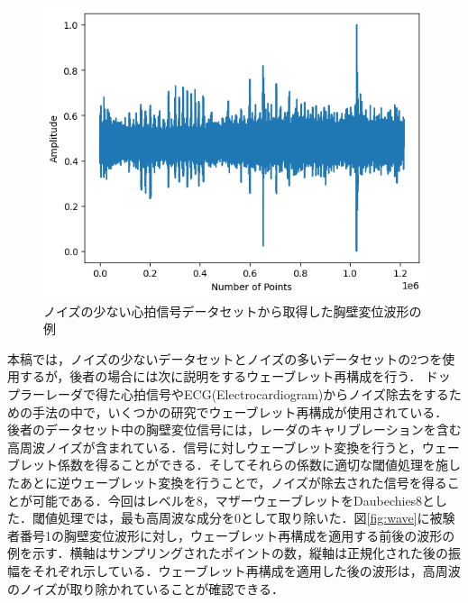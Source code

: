 \begin{figure}[H]
\begin{center}
\includegraphics[width=\linewidth]{./fig/distance01.png}
\end{center}
\caption{ノイズの少ない心拍信号データセットから取得した胸壁変位波形の例}
\label{fig:distance1}
\end{figure}

本稿では，ノイズの少ないデータセットとノイズの多いデータセットの2つを使用するが，後者の場合には次に説明をするウェーブレット再構成を行う．
ドップラーレーダで得た心拍信号やECG(Electrocardiogram)からノイズ除去をするための手法の中で，いくつかの研究でウェーブレット再構成が使用されている\cite{paper:de-noise_technique, paper:dengue, paper:ecg_noise_removal}．
後者のデータセット中の胸壁変位信号には，レーダのキャリブレーションを含む高周波ノイズが含まれている．信号に対しウェーブレット変換を行うと，ウェーブレット係数を得ることができる．そしてそれらの係数に適切な閾値処理を施したあとに逆ウェーブレット変換を行うことで，ノイズが除去された信号を得ることが可能である．今回はレベルを8，マザーウェーブレットをDaubechies8とした．閾値処理では，最も高周波な成分を0として取り除いた．図\ref{fig:wave}に被験者番号1の胸壁変位波形に対し，ウェーブレット再構成を適用する前後の波形の例を示す．横軸はサンプリングされたポイントの数，縦軸は正規化された後の振幅をそれぞれ示している．ウェーブレット再構成を適用した後の波形は，高周波のノイズが取り除かれていることが確認できる．

